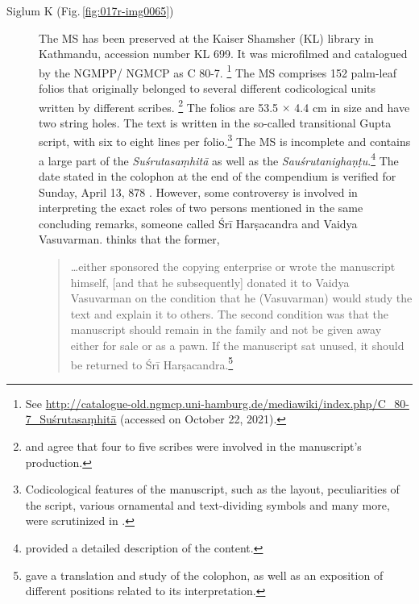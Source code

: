 \begin{description}
       
\item[Siglum K (Fig.\,\ref{fig:017r-img0065})] The MS has been preserved at the
Kaiser Shamsher (KL) library in Kathmandu, accession number KL 699. It was
microfilmed and catalogued by the NGMPP/ NGMCP as C 80-7.%
\footnote{%
    See 
    \url{http://catalogue-old.ngmcp.uni-hamburg.de/mediawiki/index.php/C_80-7_Suśrutasaṃhitā}
     (accessed on October 22, 2021).%
    } The MS comprises 152 palm-leaf folios that originally belonged to several
    different codicological units written by different scribes.%
    \footnote{%
        \textcites[46]{bhat-2020} and \textcites[11]{kleb-2021b} agree that four to
        five scribes were involved in the manuscript's production. } The folios are
        53.5 $\times$ 4.4 cm in size and have two string holes.  The text is written
        in the so-called transitional Gupta script, with six to eight lines per
        folio.\footnote{Codicological features of the manuscript, such as the layout,
            peculiarities of the script, various ornamental and text-dividing symbols and
            many more, were scrutinized in \textcites{bhat-2020}.} The MS is incomplete
            and contains a large part of the \emph{Suśrutasaṃhitā} as well as the
            \emph{Sauśrutanighaṇṭu}.\footnote{\textcite[11]{kleb-2021b} provided a
                detailed description of the content.} The date stated in the colophon at the
                end of the compendium is verified for Sunday, April 13, 878 \CE. However, some
                controversy is involved in interpreting the exact roles of two persons
                mentioned in the same concluding remarks, someone called Śrī Harṣacandra and
                Vaidya Vasuvarman. \textcites[16]{kleb-2021b} thinks that the former,
\begin{quote}
\ldots either sponsored the copying enterprise or wrote the manuscript himself,
[and that he subsequently] donated it to Vaidya Vasuvarman on the condition that
he (Vasuvarman) would study the text and explain it to others. The second
condition was that the manuscript should remain in the family and not be given
away either for sale or as a pawn. If the manuscript sat unused, it should be
returned to Śrī Harṣacandra.\footnote{\textcite[13--17]{kleb-2021b} gave a
    translation and study of the colophon, as well as an exposition of different
    positions related to its interpretation.}
\end{quote}




\end{description}
